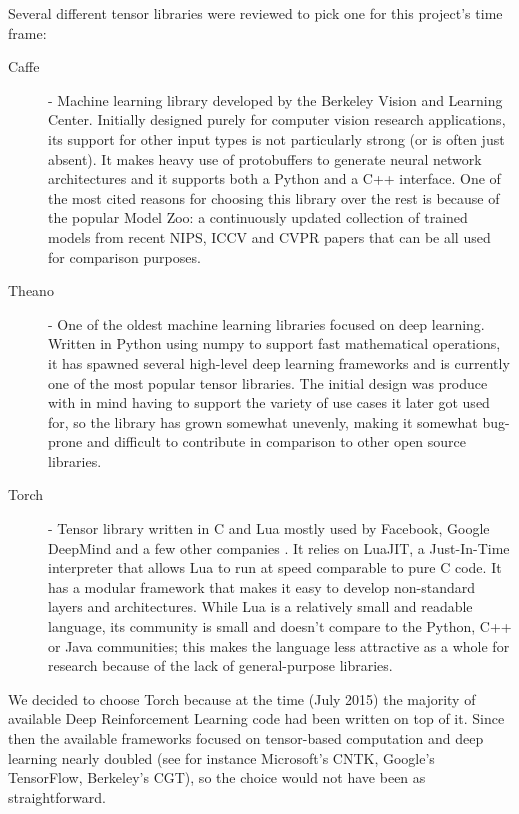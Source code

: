 Several different tensor libraries were reviewed to pick one for this project's
time frame:
\begin{description}
\item [Caffe] - Machine learning library developed by the Berkeley Vision and
  Learning Center. Initially designed purely for computer vision research
  applications, its support for other input types is not particularly strong (or
  is often just absent). It makes heavy use of protobuffers to generate neural
  network architectures and it supports both a Python and a C++ interface. One
  of the most cited reasons for choosing this library over the rest is because
  of the popular Model Zoo: a continuously updated collection of trained models
  from recent NIPS, ICCV and CVPR papers that can be all used for comparison
  purposes.
  
\item [Theano] - One of the oldest machine learning libraries focused on deep
  learning. Written in Python using numpy to support fast mathematical
  operations, it has spawned several high-level deep learning frameworks and is
  currently one of the most popular tensor libraries. The initial design was
  produce with in mind having to support the variety of use cases it later got
  used for, so the library has grown somewhat unevenly, making it somewhat
  bug-prone and difficult to contribute in comparison to other open source
  libraries.

\item [Torch] - Tensor library written in C and Lua mostly used by Facebook,
  Google DeepMind and a few other companies \cite{soumith}. It relies on LuaJIT,
  a Just-In-Time interpreter that allows Lua to run at speed comparable to pure
  C code. It has a modular framework that makes it easy to develop non-standard
  layers and architectures. While Lua is a relatively small and readable
  language, its community is small and doesn't compare to the Python, C++ or
  Java communities; this makes the language less attractive as a whole for
  research because of the lack of general-purpose libraries.
\end{description}

We decided to choose Torch because at the time (July 2015) the majority of
available Deep Reinforcement Learning code had been written on top of it. Since
then the available frameworks focused on tensor-based computation and deep
learning nearly doubled (see for instance Microsoft's CNTK, Google's TensorFlow,
Berkeley's CGT), so the choice would not have been as straightforward.
 
